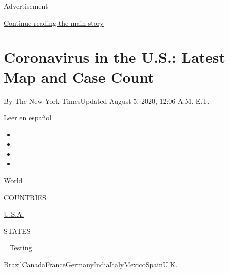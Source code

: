 Advertisement

\protect\hyperlink{after-top}{Continue reading the main story}

\hypertarget{coronavirus-in-the-us-latest-map-and-case-count}{%
\section{Coronavirus in the U.S.: Latest Map and Case
Count}\label{coronavirus-in-the-us-latest-map-and-case-count}}

By The New York TimesUpdated August 5, 2020, 12:06 A.M. E.T.

\href{https://www.nytimes.com/es/interactive/2020/espanol/mundo/coronavirus-en-estados-unidos.html}{Leer
en español}

\begin{itemize}
\item
\item
\item
\item
\end{itemize}

\href{https://www.nytimes.com/interactive/2020/world/coronavirus-maps.html}{World}~

COUNTRIES

\textbar{}
\href{https://www.nytimes.com/interactive/2020/us/coronavirus-us-cases.html}{U.S.A.}~

STATES

~
\href{https://www.nytimes.com/interactive/2020/us/coronavirus-testing.html}{Testing}

\href{https://www.nytimes.com/interactive/2020/world/americas/brazil-coronavirus-cases.html}{Brazil}\href{https://www.nytimes.com/interactive/2020/world/canada/canada-coronavirus-cases.html}{Canada}\href{https://www.nytimes.com/interactive/2020/world/europe/france-coronavirus-cases.html}{France}\href{https://www.nytimes.com/interactive/2020/world/europe/germany-coronavirus-cases.html}{Germany}\href{https://www.nytimes.com/interactive/2020/world/asia/india-coronavirus-cases.html}{India}\href{https://www.nytimes.com/interactive/2020/world/europe/italy-coronavirus-cases.html}{Italy}\href{https://www.nytimes.com/interactive/2020/world/americas/mexico-coronavirus-cases.html}{Mexico}\href{https://www.nytimes.com/interactive/2020/world/europe/spain-coronavirus-cases.html}{Spain}\href{https://www.nytimes.com/interactive/2020/world/europe/united-kingdom-coronavirus-cases.html}{U.K.}

